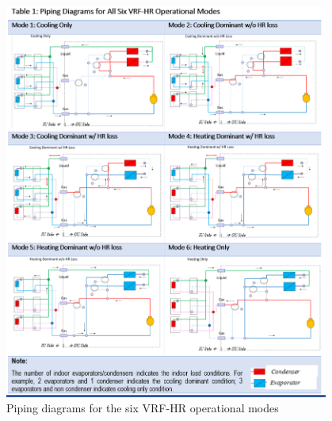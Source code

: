 \begin{figure}[hbtp] %
\centering
\includegraphics[width=0.95\textwidth, keepaspectratio=true]{media/VRF-HR-Chart-Piping.png}
\caption{Piping diagrams for the six VRF-HR operational modes \label{fig:VRF-HR-Chart-Piping}}
\end{figure}

